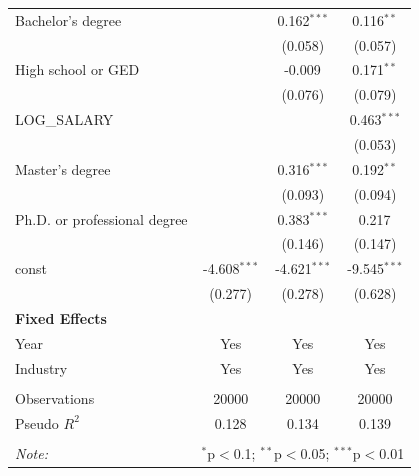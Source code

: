 \begin{table}[!htbp]
\begin{tabular}{@{\extracolsep{5pt}}lccc}
 Bachelor's degree & & 0.162$^{***}$ & 0.116$^{**}$ \\
& & (0.058) & (0.057) \\
 High school or GED & & -0.009$^{}$ & 0.171$^{**}$ \\
& & (0.076) & (0.079) \\
 LOG_SALARY & & & 0.463$^{***}$ \\
& & & (0.053) \\
 Master's degree & & 0.316$^{***}$ & 0.192$^{**}$ \\
& & (0.093) & (0.094) \\
 Ph.D. or professional degree & & 0.383$^{***}$ & 0.217$^{}$ \\
& & (0.146) & (0.147) \\
 const & -4.608$^{***}$ & -4.621$^{***}$ & -9.545$^{***}$ \\
& (0.277) & (0.278) & (0.628) \\
 \textbf{Fixed Effects} &  &  &  \\
 Year & Yes & Yes & Yes \\
 Industry & Yes & Yes & Yes \\
\hline \\[-1.8ex]
 Observations & 20000 & 20000 & 20000 \\
 Pseudo $R^2$ & 0.128 & 0.134 & 0.139 \\
\hline
\hline \\[-1.8ex]
\textit{Note:} & \multicolumn{3}{r}{$^{*}$p$<$0.1; $^{**}$p$<$0.05; $^{***}$p$<$0.01} \\
\end{tabular}
\end{table}